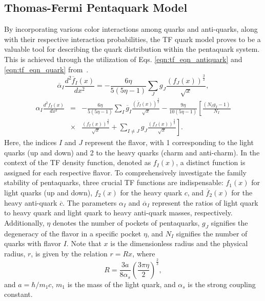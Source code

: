 \documentclass[preprint,12pt]{elsarticle}
\begin{document}
    \subsection{Thomas-Fermi Pentaquark Model} \label{subsection:tfqm}
        By incorporating various color interactions among quarks and anti-quarks, along with their respective interaction probabilities, the TF quark model proves to be a valuable tool for describing the quark distribution within the pentaquark system. This is achieved through the utilization of Eqs. \eqref{eqn:tf_eqn_antiquark} and \eqref{eqn:tf_eqn_quark} from~\cite{giri2021investigation}.
        \begin{equation}
            \overline{\alpha}_I \frac{d^2\overline{f}_I(x)}{dx^2}= -\frac{6\eta}{5(5\eta-1)} \sum_J g_J \frac{(f_J(x))^\frac{3}{2}}{\sqrt{x}},
            \label{eqn:tf_eqn_antiquark}
        \end{equation} 
        \begin{eqnarray}
            \alpha_I \frac{d^2 f_I(x)}{dx^2} &=& -\frac{6\eta}{5(5\eta-1)}\sum_I \overline{g}_I \frac{\left( \overline{f}_I(x) \right)^\frac{3}{2}}{\sqrt{x}}
            - \frac{9\eta}{10(5\eta-1)}\left[\frac{(N_I g_I-1)}{N_I} \right. \nonumber \\
            &\times&\frac{\left( f_I(x) \right)^\frac{3}{2}}{\sqrt{x}} 
             + \left. \sum_{I \ne J} g_J \frac{\left( f_J(x) \right)^\frac{3}{2}}{\sqrt{x}} \right].
            \label{eqn:tf_eqn_quark}
        \end{eqnarray}
        Here, the indices $I$ and $J$ represent the flavor, with 1 corresponding to the light quarks (up and down) and 2 to the heavy quarks (charm and anti-charm). In the context of the TF density function, denoted as $f_I(x)$, a distinct function is assigned for each respective flavor. To comprehensively investigate the family stability of pentaquarks, three crucial TF functions are indispensable: $f_1(x)$ for light quarks (up and down), $f_2(x)$ for the heavy quark $c$, and $\overline{f}_{2}(x)$ for the heavy anti-quark $\overline{c}$. The parameters $\alpha_I$ and $\overline{\alpha}_I$ represent the ratios of light quark to heavy quark and light quark to heavy anti-quark masses, respectively. Additionally, $\eta$ denotes the number of pockets of pentaquarks, $g_J$ signifies the degeneracy of the flavor in a specific pocket $\eta$, and $N_I$ signifies the number of quarks with flavor $I$. Note that $x$ is the dimensionless radius and the physical radius, $r$, is given by the relation  $r = Rx$, where  
        \begin{equation}
            R=\frac{3 a}{8\alpha_{s}}  \left(\frac{ 3 \pi \eta}{2} \right)^\frac{2}{3},
            \label{eqn:radius_constant}
        \end{equation}
        and $ a=\hbar / m_{1} c$, $m_{1}$ is the mass of the light quark, and $\alpha_{s}$ is the strong coupling constant.
        
\end{document}
